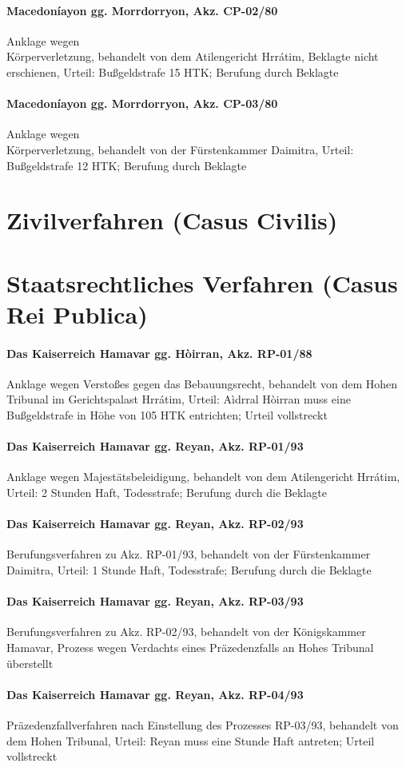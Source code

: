 \documentclass{article}
\begin{document}
\paragraph{Macedoníayon gg. Morrdorryon, Akz. CP-02/80}
Anklage wegen\\Körperverletzung, behandelt von dem Atilengericht Hrrátim, Beklagte nicht erschienen, Urteil: Bußgeldstrafe 15 HTK; Berufung durch Beklagte
\paragraph{Macedoníayon gg. Morrdorryon, Akz. CP-03/80}
Anklage wegen\\Körperverletzung, behandelt von der Fürstenkammer Daimitra, Urteil: Bußgeldstrafe 12 HTK; Berufung durch Beklagte

\section{Zivilverfahren (Casus Civilis)}

\section{Staatsrechtliches Verfahren (Casus Rei Publica)}
\paragraph{Das Kaiserreich Hamavar gg. Hòirran, Akz. RP-01/88}
Anklage wegen Verstoßes gegen das Bebauungsrecht, behandelt von dem Hohen Tribunal im Gerichtspalast Hrrátim, Urteil: Aìdrral Hòirran muss eine Bußgeldstrafe in Höhe von 105 HTK entrichten; Urteil vollstreckt
\paragraph{Das Kaiserreich Hamavar gg. Reyan, Akz. RP-01/93}
Anklage wegen Majestätsbeleidigung, behandelt von dem Atilengericht Hrrátim, Urteil: 2 Stunden Haft, Todesstrafe; Berufung durch die Beklagte
\paragraph{Das Kaiserreich Hamavar gg. Reyan, Akz. RP-02/93}
Berufungsverfahren zu Akz. RP-01/93, behandelt von der Fürstenkammer Daimitra, Urteil: 1 Stunde Haft, Todesstrafe; Berufung durch die Beklagte
\paragraph{Das Kaiserreich Hamavar gg. Reyan, Akz. RP-03/93}
Berufungsverfahren zu Akz. RP-02/93, behandelt von der Königskammer Hamavar, Prozess wegen Verdachts eines Präzedenzfalls an Hohes Tribunal überstellt
\paragraph{Das Kaiserreich Hamavar gg. Reyan, Akz. RP-04/93}
Präzedenzfallverfahren nach Einstellung des Prozesses RP-03/93, behandelt von dem Hohen Tribunal, Urteil: Reyan muss eine Stunde Haft antreten; Urteil vollstreckt
\end{document}
